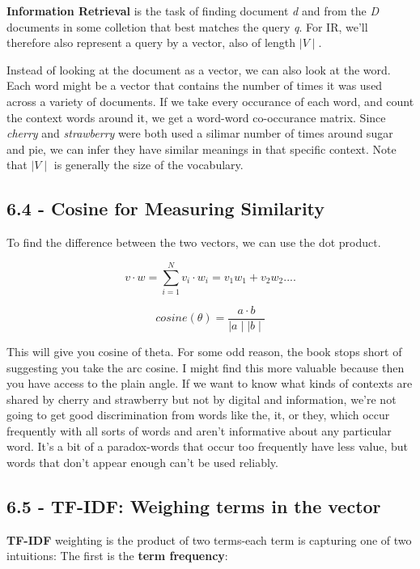 \documentclass{article}
\begin{document}
\textbf{Information Retrieval} is the task of finding document \textit{d} and from the \textit{D} documents in some colletion that best matches
the query \textit{q}. For IR, we'll therefore also represent a query by a vector, also of length $\mid V \mid $. \newline

Instead of looking at the document as a vector, we can also look at the word. Each word might be a vector that contains the number of times it was used across a variety
of documents. If we take every occurance of each word, and count the context words around it, we get a word-word co-occurance matrix. Since \textit{cherry} and \textit{strawberry}
were both used a silimar number of times around sugar and pie, we can infer they have similar meanings in that specific context. Note that $\mid V \mid $ is generally the size of the vocabulary.

\subsection{6.4 - Cosine for Measuring Similarity}

To find the difference between the two vectors, we can use the dot product.

\[
    v \cdot w = \sum_{i=1}^{N} v_i\cdot w_i = v_1 w_1 + v_2 w_2....
\]

\[
    cosine(\theta) = \frac{a \cdot b}{\mid a \mid  \mid b \mid }
\]

This will give you cosine of theta. For some odd reason, the book stops short of suggesting you take the arc cosine. I might find this more valuable because
then you have access to the plain angle. If we want to know what kinds of contexts are shared
by cherry and strawberry but not by digital and information, we’re not going to get
good discrimination from words like the, it, or they, which occur frequently with
all sorts of words and aren’t informative about any particular word. \newline
It's a bit of a paradox-words that occur too frequently have less value, but words that don't appear enough can't
be used reliably.

\subsection{6.5 - TF-IDF: Weighing terms in the vector}

\textbf{TF-IDF} weighting is the product of two terms-each term is capturing one of two intuitions: The first is the \textbf{term frequency}:
\end{document}
